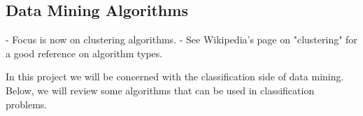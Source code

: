 \subsection{Data Mining Algorithms}\label{sec:minalgo}

\begin{Notes}
- Focus is now on clustering algorithms.
- See Wikipedia's page on "clustering" for a good reference on algorithm types.\\
\end{Notes}

In this project we will be concerned with the classification side of data
mining. Below, we will review some algorithms that can be used in
classification problems.






